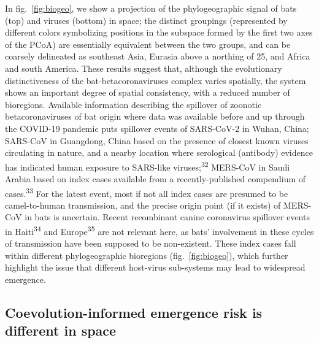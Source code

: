 \documentclass[10pt,oneside]{article}
\begin{document}
In fig.~\ref{fig:biogeo}, we show a projection of the phylogeographic
signal of bats (top) and viruses (bottom) in space; the distinct
groupings (represented by different colors symbolizing positions in the
subspace formed by the first two axes of the PCoA) are essentially
equivalent between the two groups, and can be coarsely delineated as
southeast Asia, Eurasia above a northing of 25, and Africa and south
America. These results suggest that, although the evolutionary
distinctiveness of the bat-betacoronaviruses complex varies spatially,
the system shows an important degree of spatial consistency, with a
reduced number of bioregions. Available information describing the
spillover of zoonotic betacoronaviruses of bat origin where data was
available before and up through the COVID-19 pandemic puts spillover
events of SARS-CoV-2 in Wuhan, China; SARS-CoV in Guangdong, China based
on the presence of closest known viruses circulating in nature, and a
nearby location where serological (antibody) evidence has indicated
human exposure to SARS-like viruses;\textsuperscript{32} MERS-CoV in
Saudi Arabia based on index cases available from a recently-published
compendium of cases.\textsuperscript{33} For the latest event, most if
not all index cases are presumed to be camel-to-human transmission, and
the precise origin point (if it exists) of MERS-CoV in bats is
uncertain. Recent recombinant canine coronavirus spillover events in
Haiti\textsuperscript{34} and Europe\textsuperscript{35} are not
relevant here, as bats' involvement in these cycles of transmission have
been supposed to be non-existent. These index cases fall within
different phylogeographic bioregions (fig.~\ref{fig:biogeo}), which
further highlight the issue that different host-virus sub-systems may
lead to widespread emergence.

\hypertarget{coevolution-informed-emergence-risk-is-different-in-space}{%
\subsection{Coevolution-informed emergence risk is different in
space}\label{coevolution-informed-emergence-risk-is-different-in-space}}
\end{document}

